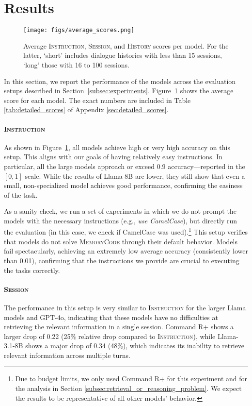 \section{Results}
\label{sec:experiments}

\begin{figure}[tb]
    \centering
    \texttt{[image: figs/average\_scores.png]}
    \caption{Average \textsc{Instruction}, \textsc{Session}, and \textsc{History} scores per model. For the latter, `short' includes dialogue histories with less than 15 sessions, `long'  those with 16 to 100 sessions.}
    \label{fig:average_score}
\end{figure}



In this section, we report the performance of the models across the evaluation setups described in Section~\ref{subsec:experiments}. Figure~\ref{fig:average_score} shows the average score for each model. The exact numbers are included in Table \ref{tab:detailed_scores} of Appendix \ref{sec:detailed_scores}. 

\paragraph{\textsc{Instruction}} As shown in Figure~\ref{fig:average_score}, all models achieve high or very high accuracy on this setup. 
This aligns with our goals of having relatively easy instructions.
In particular, all the large models approach or exceed 0.9 accuracy---reported in the $[0,1]$ scale. 
While the results of Llama-8B are lower, they still show that even a small, non-specialized model achieves good performance, confirming the easiness of the task.

As a sanity check, we run a set of experiments in which we do not prompt the models with the necessary instructions (e.g., \textit{use CamelCase}), but directly run the evaluation (in this case, we check if CamelCase was used).\footnote{
Due to budget limits, we only used Command R+ for this experiment and for the analysis in Section \ref{subsec:retrieval_or_reasoning_problem}.
We expect the results to be representative of all other models' behavior.} This setup verifies that models do not solve \textsc{MemoryCode} through their default behavior. Models fail spectacularly, achieving an extremely low average accuracy (consistently lower than 0.01), confirming that the instructions we provide are crucial to executing the tasks correctly. 

\paragraph{\textsc{Session}} The performance in this setup is very similar to \textsc{Instruction} for the larger Llama models and GPT-4o, indicating that these models have no difficulties at retrieving the relevant information in a single session. Command R+ shows a larger drop of 0.22 (25\% relative drop compared to \textsc{Instruction}), while Llama-3.1-8B shows a major drop of 0.34 (48\%), which indicates its inability to retrieve relevant information across multiple turns. 


